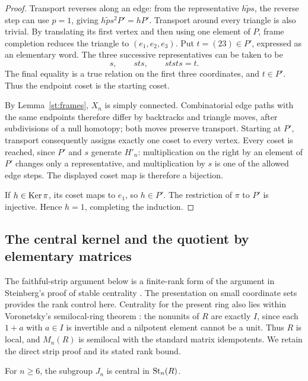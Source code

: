 \begin{proof}
Transport reverses along an edge: from the representative
$h\widetilde p s$, the reverse step can use $p=1$, giving
$h\widetilde p s^2P'=hP'$. Transport around every triangle is also
trivial. By translating its first vertex and then using one element
of $P$, frame completion reduces the triangle to $(e_1,e_2,e_3)$.
Put $t=(23)\in P'$, expressed as an elementary word. The three
successive representatives can be taken to be
\[
 s,\qquad sts,\qquad ststs=t.
\]
The final equality is a true relation on the first three coordinates,
and $t\in P'$. Thus the endpoint coset is the starting coset.

By Lemma~\ref{st:frames}, $X_n$ is simply connected. Combinatorial
edge paths with the same endpoints therefore differ by backtracks
and triangle moves, after subdivisions of a null homotopy; both moves
preserve transport. Starting at $P'$, transport consequently assigns
exactly one coset to every vertex. Every coset is reached, since
$P'$ and $s$ generate $H'_n$: multiplication on the right by an
element of $P'$ changes only a representative, and multiplication by
$s$ is one of the allowed edge steps. The displayed coset map is
therefore a bijection.

If $h\in\operatorname{Ker}\pi$, its coset maps to $e_1$, so $h\in P'$.
The restriction of $\pi$ to $P'$ is injective. Hence $h=1$, completing
the induction.
\end{proof}

\subsection{The central kernel and the quotient by elementary matrices}

The faithful-strip argument below is a finite-rank form of the
argument in Steinberg's proof of stable centrality
\cite[Section~7, Theorem~14]{Steinberg1967}. The presentation on small
coordinate sets provides the rank control here. Centrality for the
present ring also lies within Voronetsky's semilocal-ring theorem
\cite[Theorem~1]{Voronetsky2021Centrality}: the nonunits of $R$ are
exactly $I$, since each $1+a$ with $a\in I$ is invertible and a nilpotent
element cannot be a unit. Thus $R$ is local, and $M_n(R)$ is semilocal
with the standard matrix idempotents. We retain the direct strip proof
and its stated rank bound.

\begin{proposition}\label{prop:centrality}
For $n\geq6$, the subgroup $J_n$ is central in $\operatorname{St}_n(R)$.
\end{proposition}

